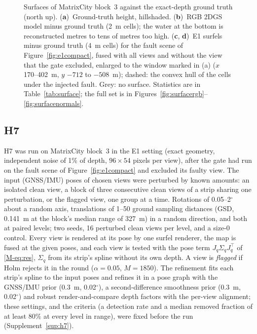 \begin{figure}[!t]
\centering

\caption{Surfaces of MatrixCity block~3 against the exact-depth ground truth (north up). (\textbf{a})~Ground-truth
height, hillshaded. (\textbf{b})~RGB 2DGS model minus ground truth (2~m cells); the water at the bottom is
reconstructed metres to tens of metres too high. (\textbf{c}, \textbf{d})~E1 surfels minus ground truth (4~m
cells) for the fault scene of Figure~\ref{fig:e1compact}, fused with all views and without the view that the
gate excluded, enlarged to the window marked in (a) ($x$ 170--402~m, $y$ $-712$ to $-508$~m); dashed: the convex
hull of the cells under the injected fault. Grey: no surface. Statistics are in
Table~\ref{tab:surface}; the full set is in Figures~\ref{fig:surfacergb}--\ref{fig:surfacenormals}.}
\label{fig:surfacecompact}
\end{figure}
\FloatBarrier

\subsection{H7}
\label{sup:h7full}
H7 was run on MatrixCity block~3 in the E1 setting (exact geometry, independent noise of 1\% of depth,
$96\times54$ pixels per view), after the gate had run on the fault scene of Figure~\ref{fig:e1compact} and
excluded its faulty view. The input (GNSS/IMU) poses of chosen views were perturbed by known amounts: an
isolated clean view, a block of three consecutive clean views of a strip sharing one perturbation, or the
flagged view, one group at a time. Rotations of 0.05--2$^{\circ}$ about a random axis, translations of 1--50
ground sampling distances (GSD, 0.141~m at the block's median range of 327~m) in a random direction, and
both at paired levels; two seeds, 16 perturbed clean views per level, and a size-0 control. Every view is
rendered at its pose by one surfel renderer, the map is fused at the given poses, and each view is tested
with the pose term $J_q\Sigma_qJ_q^{\top}$ of \eqref{M-eq:res}, $\Sigma_q$ from its strip's spline without its own
depth. A view is \emph{flagged} if Holm rejects it in the round ($\alpha=0.05$, $M=1850$). The refinement fits
each strip's spline to the input poses and refines it in a pose graph with the GNSS/IMU prior
(0.3~m, 0.02$^{\circ}$), a second-difference smoothness prior (0.3~m, 0.02$^{\circ}$) and robust
render-and-compare depth factors with the per-view alignment; these settings, and the criteria (a detection
rate and a median removed fraction of at least 80\% at every level in range), were fixed before the run
(Supplement~\ref{sup:h7}).

